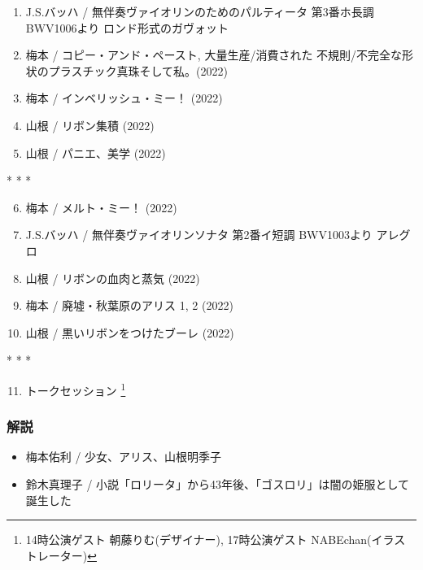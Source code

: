 \documentclass[a6paper, 9pt, openright, titlepage, twoside]{ltjsarticle}
\begin{document}
\begin{enumerate}
\item J.S.バッハ / 無伴奏ヴァイオリンのためのパルティータ 第3番ホ長調 BWV1006より ロンド形式のガヴォット {} 
\item 梅本 / コピー・アンド・ペースト, 大量生産/消費された 不規則/不完全な形状のプラスチック真珠そして私。(2022)  {} 
\item 梅本 / インベリッシュ・ミー！ (2022)  {} 
\item 山根 / リボン集積  (2022)  {} 
\item 山根 / パニエ、美学  (2022)   {}
\end{enumerate}
\vspace{-3mm}
 \hspace{8\zw}    * * *%
 \vspace{-5mm}
\begin{enumerate}
\setcounter{enumi}{5}
\item 梅本 / メルト・ミー！ (2022) {} 
\item J.S.バッハ / 無伴奏ヴァイオリンソナタ 第2番イ短調 BWV1003より アレグロ {} 
\item 山根 / リボンの血肉と蒸気  (2022) {}  
\item 梅本 / 廃墟・秋葉原のアリス 1, 2  (2022)  {} 
\item 山根 / 黒いリボンをつけたブーレ (2022)  {} 
\end{enumerate}
\vspace{-3mm}
 \hspace{8\zw}    * * *%
 \vspace{-5mm}
\begin{enumerate}
\setcounter{enumi}{10}
\item  トークセッション \footnote{14時公演ゲスト  朝藤りむ(デザイナー), 17時公演ゲスト  NABEchan(イラストレーター)}
\end{enumerate}

\nopagebreak

\vspace{-5mm}
\subsubsection*{解説}
\begin{itemize}
\item 梅本佑利 / 少女、アリス、山根明季子 {}  
\item 鈴木真理子  / 小説「ロリータ」から43年後、「ゴスロリ」は闇の姫服として誕生した  {}  
\end{itemize}
\newpage
\end{document}
